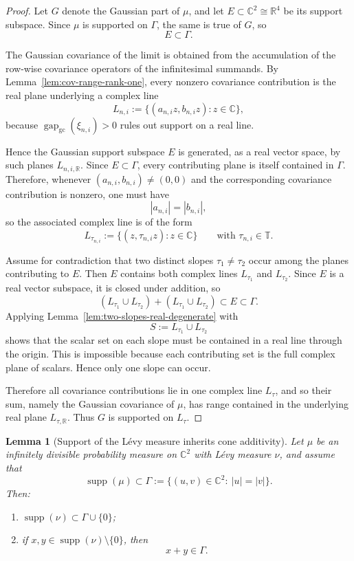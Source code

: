 \documentclass[11pt]{amsart}
\newtheorem{lemma}[theorem]{Lemma}
\newcommand{\C}{\mathbb{C}}
\newcommand{\R}{\mathbb{R}}
\newcommand{\T}{\mathbb{T}}
\newcommand{\supp}{\operatorname{supp}}
\newcommand{\gapgc}{\operatorname{gap}_{\mathrm{gc}}}
\begin{document}
\begin{proof}
Let $G$ denote the Gaussian part of $\mu$, and let $E\subset \C^2\cong\R^4$ be
its support subspace.  Since $\mu$ is supported on $\Gamma$, the same is true of
$G$, so
\[
  E\subset \Gamma.
\]

The Gaussian covariance of the limit is obtained from the accumulation of the
row-wise covariance operators of the infinitesimal summands.  By
Lemma~\ref{lem:cov-range-rank-one}, every nonzero covariance contribution is the
real plane underlying a complex line
\[
  L_{n,i}:=\{(a_{n,i}z,b_{n,i}z): z\in\C\},
\]
because $\gapgc(\xi_{n,i})>0$ rules out support on a real line.

Hence the Gaussian support subspace $E$ is generated, as a real vector space, by
such planes $L_{n,i,\R}$.  Since $E\subset \Gamma$, every contributing plane is
itself contained in $\Gamma$.  Therefore, whenever $(a_{n,i},b_{n,i})\ne(0,0)$
and the corresponding covariance contribution is nonzero, one must have
\[
  |a_{n,i}|=|b_{n,i}|,
\]
so the associated complex line is of the form
\[
  L_{\tau_{n,i}}:=\{(z,\tau_{n,i}z): z\in\C\}
  \qquad\text{with } \tau_{n,i}\in\T.
\]

Assume for contradiction that two distinct slopes $\tau_1\ne\tau_2$ occur among
the planes contributing to $E$.  Then $E$ contains both complex lines
$L_{\tau_1}$ and $L_{\tau_2}$.  Since $E$ is a real vector subspace, it is
closed under addition, so
\[
  (L_{\tau_1}\cup L_{\tau_2}) + (L_{\tau_1}\cup L_{\tau_2}) \subset E\subset \Gamma.
\]
Applying Lemma~\ref{lem:two-slopes-real-degenerate} with
\[
  S:=L_{\tau_1}\cup L_{\tau_2}
\]
shows that the scalar set on each slope must be contained in a real line
through the origin.  This is impossible because each contributing set is the
full complex plane of scalars.  Hence only one slope can occur.

Therefore all covariance contributions lie in one complex line $L_\tau$, and so
their sum, namely the Gaussian covariance of $\mu$, has range contained in the
underlying real plane $L_{\tau,\R}$.  Thus $G$ is supported on $L_\tau$.
\end{proof}

\begin{lemma}[Support of the L\'evy measure inherits cone additivity]
\label{lem:levy-cone-additivity}
Let $\mu$ be an infinitely divisible probability measure on $\C^2$ with L\'evy
measure $\nu$, and assume that
\[
  \supp(\mu)\subset \Gamma:=\{(u,v)\in\C^2:\ |u|=|v|\}.
\]
Then:
\begin{enumerate}[label=\rm(\arabic*)]
\item $\supp(\nu)\subset \Gamma\cup\{0\}$;
\item if $x,y\in \supp(\nu)\setminus\{0\}$, then
\[
  x+y\in \Gamma.
\]
\end{enumerate}
\end{lemma}
\end{document}
